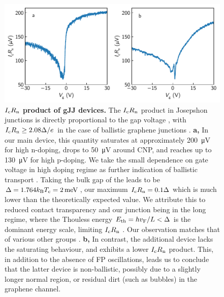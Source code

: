 \begin{figure}[]
	\centering
	\includegraphics[width=\linewidth]{chapter-gJJ/figs/si_icrn}
	\caption{{\bf $I_{\rm c} R_{\rm n}$ product of gJJ devices.}
		The $I_{\rm c} R_{\rm n}$ product in Josepshon junctions is directly proportional to the gap voltage \cite{tinkham_introduction_1996}, with $I_{\rm c} R_{\rm n}\geq2.08\Delta/e$ in the case of ballistic graphene junctions \cite{titov_josephson_2006,cuevas_subharmonic_2006}.
		\textbf{a,} In our main device, this quantity saturates at approximately \SI{200}{\micro V} for high n-doping, drops to \SI{50}{\micro V} around CNP, and reaches up to \SI{130}{\micro V} for high p-doping.
		We take the small dependence on gate voltage in high doping regime as further indication of ballistic transport \cite{mizuno_ballisticlike_2013,zhu_supercurrent_2018}.
		Taking the bulk gap of the leads to be $\Delta=1.764 k_{\rm B} T_{\rm c} = \SI{2}{meV}$, our maximum $I_{\rm c} R_{\rm n}=0.1\Delta$ which is much lower than the theoretically expected value.
		We attribute this to reduced contact transparency and our junction being in the long regime, where the Thouless energy $E_{\rm th}=hv_{\rm F}/L < \Delta $ is the dominant energy scale, limiting $I_{\rm c} R_{\rm n}$ \cite{dubos_josephson_2001}.
		Our observation matches that of various other groups \cite{mizuno_ballisticlike_2013,benshalom_quantum_2015,borzenets_ballistic_2016a,zhu_supercurrent_2018}.
		\textbf{b,} In contrast, the additional device lacks the saturating behaviour, and exhibits a lower $I_{\rm c}R_{\rm n}$ product.
		This, in addition to the absence of FP oscillations, leads us to conclude that the latter device is non-ballistic, possibly due to a slightly longer normal region, or residual dirt (such as bubbles) in the graphene channel.
	}
	\label{fig:icrn}
\end{figure}

